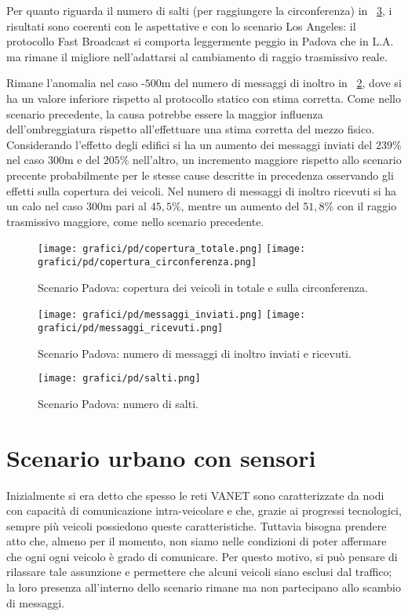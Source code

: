 Per quanto riguarda il numero di salti (per raggiungere la circonferenza) in \figurename~\ref{fig:risultati-padova-salti},
i risultati sono coerenti con le aspettative e con lo scenario Los Angeles:
il protocollo Fast Broadcast si comporta leggermente peggio in Padova che in L.A.
ma rimane il migliore nell'adattarsi al cambiamento di raggio trasmissivo reale.

Rimane l'anomalia nel caso \statica{}-$500$m del numero di messaggi di inoltro in \figurename~\ref{fig:risultati-padova-messaggi},
dove si ha un valore inferiore rispetto al protocollo statico con stima corretta.
Come nello scenario precedente, la causa potrebbe essere la maggior influenza dell'ombreggiatura rispetto
all'effettuare una stima corretta del mezzo fisico.
Considerando l'effetto degli edifici si ha un aumento dei messaggi inviati del $239\%$ nel caso $300$m e del $205\%$ nell'altro,
un incremento maggiore rispetto allo scenario precente probabilmente per le stesse cause
descritte in precedenza osservando gli effetti sulla copertura dei veicoli.
Nel numero di messaggi di inoltro ricevuti si ha un calo nel caso $300$m pari al $45,5\%$,
mentre un aumento del $51,8\%$ con il raggio trasmissivo maggiore, come nello scenario precedente.
%
\begin{figure}[htbp]
	\centering
		\texttt{[image: grafici/pd/copertura\_totale.png]}
		\texttt{[image: grafici/pd/copertura\_circonferenza.png]}
\caption{Scenario Padova: copertura dei veicoli in totale e sulla circonferenza.\label{fig:risultati-padova-copertura}}
\end{figure}
%
\begin{figure}[htbp]
	\centering
		\texttt{[image: grafici/pd/messaggi\_inviati.png]}
		\texttt{[image: grafici/pd/messaggi\_ricevuti.png]}
\caption{Scenario Padova: numero di messaggi di inoltro inviati e ricevuti.\label{fig:risultati-padova-messaggi}}
\end{figure}
%
\begin{figure}[htbp]
	\centering
		\texttt{[image: grafici/pd/salti.png]}
\caption{Scenario Padova: numero di salti.\label{fig:risultati-padova-salti}}
\end{figure}
%
\clearpage
%
%
\section{Scenario urbano con sensori}\label{sec:configurazione-sensori}
Inizialmente si era detto che spesso le reti VANET sono caratterizzate da nodi con capacità di comunicazione
intra-veicolare e che, grazie ai progressi tecnologici, sempre più veicoli possiedono queste caratteristiche.
Tuttavia bisogna prendere atto che, almeno per il momento, non siamo nelle condizioni
di poter affermare che ogni ogni veicolo è grado di comunicare.
Per questo motivo, si può pensare di rilassare tale assunzione e permettere che alcuni veicoli
siano esclusi dal traffico; la loro presenza all'interno dello scenario rimane ma non partecipano allo scambio di messaggi.

